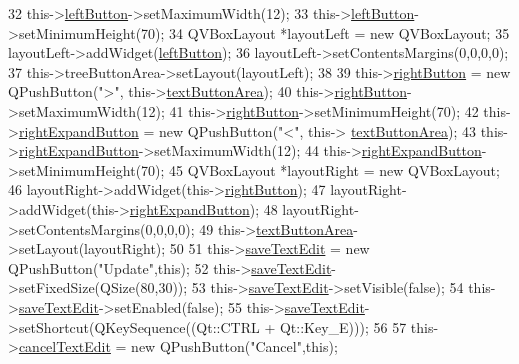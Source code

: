 \begin{DoxyCode}
32     this->\hyperlink{classArea_ac3abf6be3202aedd2cc9ccf8da053989}{leftButton}->setMaximumWidth(12);
33     this->\hyperlink{classArea_ac3abf6be3202aedd2cc9ccf8da053989}{leftButton}->setMinimumHeight(70);
34     QVBoxLayout *layoutLeft = \textcolor{keyword}{new} QVBoxLayout;
35     layoutLeft->addWidget(\hyperlink{classArea_ac3abf6be3202aedd2cc9ccf8da053989}{leftButton});
36     layoutLeft->setContentsMargins(0,0,0,0);
37     this->treeButtonArea->setLayout(layoutLeft);
38 
39     this->\hyperlink{classArea_a7dda00e73b5dda5bcf308bc9451d47aa}{rightButton} = \textcolor{keyword}{new} QPushButton(\textcolor{stringliteral}{">"}, this->\hyperlink{classArea_a6c88fecf579e816309421ebb2f4110e8}{textButtonArea});
40     this->\hyperlink{classArea_a7dda00e73b5dda5bcf308bc9451d47aa}{rightButton}->setMaximumWidth(12);
41     this->\hyperlink{classArea_a7dda00e73b5dda5bcf308bc9451d47aa}{rightButton}->setMinimumHeight(70);
42     this->\hyperlink{classArea_abe2c125e65ad35f1a154ec4b044a7cf1}{rightExpandButton} = \textcolor{keyword}{new} QPushButton(\textcolor{stringliteral}{"<"}, this->
      \hyperlink{classArea_a6c88fecf579e816309421ebb2f4110e8}{textButtonArea});
43     this->\hyperlink{classArea_abe2c125e65ad35f1a154ec4b044a7cf1}{rightExpandButton}->setMaximumWidth(12);
44     this->\hyperlink{classArea_abe2c125e65ad35f1a154ec4b044a7cf1}{rightExpandButton}->setMinimumHeight(70);
45     QVBoxLayout *layoutRight = \textcolor{keyword}{new} QVBoxLayout;
46     layoutRight->addWidget(this->\hyperlink{classArea_a7dda00e73b5dda5bcf308bc9451d47aa}{rightButton});
47     layoutRight->addWidget(this->\hyperlink{classArea_abe2c125e65ad35f1a154ec4b044a7cf1}{rightExpandButton});
48     layoutRight->setContentsMargins(0,0,0,0);
49     this->\hyperlink{classArea_a6c88fecf579e816309421ebb2f4110e8}{textButtonArea}->setLayout(layoutRight);
50 
51     this->\hyperlink{classArea_a9f02653780f96daba713c2e71e562da6}{saveTextEdit} = \textcolor{keyword}{new} QPushButton(\textcolor{stringliteral}{"Update"},\textcolor{keyword}{this});
52     this->\hyperlink{classArea_a9f02653780f96daba713c2e71e562da6}{saveTextEdit}->setFixedSize(QSize(80,30));
53     this->\hyperlink{classArea_a9f02653780f96daba713c2e71e562da6}{saveTextEdit}->setVisible(\textcolor{keyword}{false});
54     this->\hyperlink{classArea_a9f02653780f96daba713c2e71e562da6}{saveTextEdit}->setEnabled(\textcolor{keyword}{false});
55     this->\hyperlink{classArea_a9f02653780f96daba713c2e71e562da6}{saveTextEdit}->setShortcut(QKeySequence((Qt::CTRL + Qt::Key\_E)));
56 
57     this->\hyperlink{classArea_a48b08ee11ec952b793e8d92dfc9ef7d4}{cancelTextEdit} = \textcolor{keyword}{new} QPushButton(\textcolor{stringliteral}{"Cancel"},\textcolor{keyword}{this});

\end{DoxyCode}
